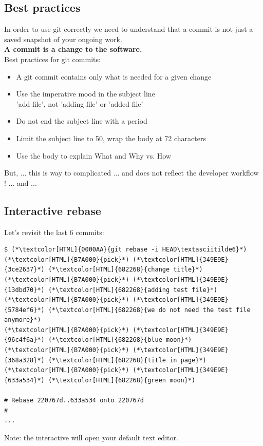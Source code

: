\subsection{Best practices}
\begin{frame}[fragile]
  \subslidetitle
  In order to use git correctly we need to understand that a commit is not just a saved snapshot of your ongoing work. \\
  \vspace{1em}
  \textbf{A commit is a change to the software.} \\
  \vspace{1em}
  Best practices for git commits:
  \begin{itemize}
    \pause
    \item A git commit contains only what is needed for a given change
    \pause
    \item Use the imperative mood in the subject line \\
      'add file', not 'adding file' or 'added file'
    \pause
    \item Do not end the subject line with a period
    \pause
    \item Limit the subject line to 50, wrap the body at 72 characters
    \pause
    \item Use the body to explain What and Why vs. How
  \end{itemize}
  \vspace{1em}
  But, ... this is way to complicated ... and does not reflect the developer workflow ! ... and ...
\end{frame}

\subsection{Interactive rebase}
\begin{frame}[fragile]
  \subslidetitle

  Let's revisit the last 6 commits:
  \begin{lstlisting}
$ (*\textcolor[HTML]{0000AA}{git rebase -i HEAD\textasciitilde6}*)
(*\textcolor[HTML]{B7A000}{pick}*) (*\textcolor[HTML]{349E9E}{3ce2637}*) (*\textcolor[HTML]{682268}{change title}*)
(*\textcolor[HTML]{B7A000}{pick}*) (*\textcolor[HTML]{349E9E}{13dbd70}*) (*\textcolor[HTML]{682268}{adding test file}*)
(*\textcolor[HTML]{B7A000}{pick}*) (*\textcolor[HTML]{349E9E}{5784ef6}*) (*\textcolor[HTML]{682268}{we do not need the test file anymore}*)
(*\textcolor[HTML]{B7A000}{pick}*) (*\textcolor[HTML]{349E9E}{96c4f6a}*) (*\textcolor[HTML]{682268}{blue moon}*)
(*\textcolor[HTML]{B7A000}{pick}*) (*\textcolor[HTML]{349E9E}{368a328}*) (*\textcolor[HTML]{682268}{title in page}*)
(*\textcolor[HTML]{B7A000}{pick}*) (*\textcolor[HTML]{349E9E}{633a534}*) (*\textcolor[HTML]{682268}{green moon}*)

# Rebase 220767d..633a534 onto 220767d
#
...
\end{lstlisting}

  Note: the interactive  will open your default text editor.
\end{frame}

